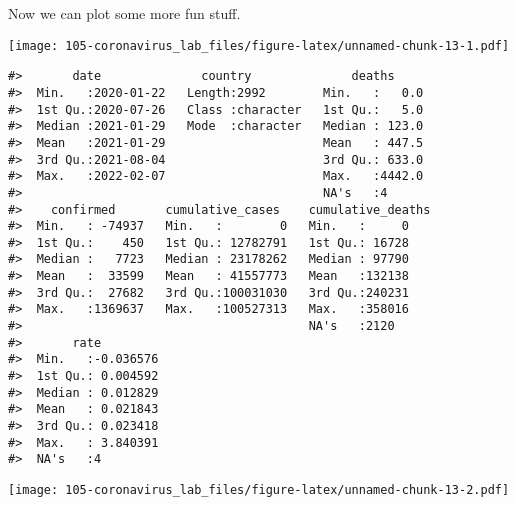 \documentclass[
]{book}
\begin{document}
Now we can plot some more fun stuff.

\texttt{[image: 105-coronavirus\_lab\_files/figure-latex/unnamed-chunk-13-1.pdf]}

\begin{verbatim}
#>       date              country              deaths      
#>  Min.   :2020-01-22   Length:2992        Min.   :   0.0  
#>  1st Qu.:2020-07-26   Class :character   1st Qu.:   5.0  
#>  Median :2021-01-29   Mode  :character   Median : 123.0  
#>  Mean   :2021-01-29                      Mean   : 447.5  
#>  3rd Qu.:2021-08-04                      3rd Qu.: 633.0  
#>  Max.   :2022-02-07                      Max.   :4442.0  
#>                                          NA's   :4       
#>    confirmed       cumulative_cases    cumulative_deaths
#>  Min.   : -74937   Min.   :        0   Min.   :     0   
#>  1st Qu.:    450   1st Qu.: 12782791   1st Qu.: 16728   
#>  Median :   7723   Median : 23178262   Median : 97790   
#>  Mean   :  33599   Mean   : 41557773   Mean   :132138   
#>  3rd Qu.:  27682   3rd Qu.:100031030   3rd Qu.:240231   
#>  Max.   :1369637   Max.   :100527313   Max.   :358016   
#>                                        NA's   :2120     
#>       rate          
#>  Min.   :-0.036576  
#>  1st Qu.: 0.004592  
#>  Median : 0.012829  
#>  Mean   : 0.021843  
#>  3rd Qu.: 0.023418  
#>  Max.   : 3.840391  
#>  NA's   :4
\end{verbatim}

\texttt{[image: 105-coronavirus\_lab\_files/figure-latex/unnamed-chunk-13-2.pdf]}

  
\end{document}
